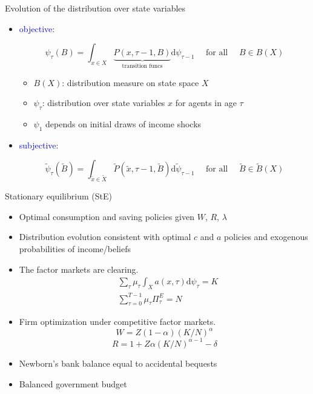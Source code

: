 \documentclass{beamer}
\begin{document}
\begin{frame}{Evolution of the distribution over state variables}
		\begin{itemize}
		\item \textcolor{blue}{objective}: 
		
		\begin{equation*}
			\label{Eq:DistDyn}
			\psi_{\tau}(B)=\int_{x \in X} \underbrace{P(x, \tau-1, B)}_{\text{transition funcs}}  \mathrm{d}\psi_{\tau-1} \quad \text { for all } \quad B\in B(X)
		\end{equation*}
	
	\begin{itemize}
		\item $B(X)$:  distribution measure on state space $X$
		\item $\psi_{\tau}$: distribution over state variables $x$ for agents in age $\tau$
		\item $\psi_{1}$ depends on initial draws of income shocks 
	\end{itemize}

		\item \textcolor{blue}{subjective}: 
		
		\begin{equation*}
			\label{Eq:DistDynSub}
			\tilde \psi_{\tau}(\tilde B)=\int_{\tilde x \in \tilde X} \tilde P(\tilde x, \tau-1, \tilde B) \mathrm{d} \tilde \psi_{\tau-1} \quad \text { for all } \quad \tilde B \in \tilde B(X)
		\end{equation*}
	
	\end{itemize}
\end{frame}

\begin{frame}{Stationary equilibrium (StE)}
\begin{itemize}
	\item Optimal consumption and saving policies given $W$, $R$, $\lambda$
	\item Distribution evolution consistent with optimal $c$ and $a$ policies and exogenous probabilities of income/beliefs
	\item The factor markets are clearing. 
	\begin{equation*}
	\begin{split}
		& \sum_{\tau} \mu_{\tau} \int_{X}a(x, \tau) \mathrm{d} \psi_{\tau}=K \\
		& \sum^{T-1}_{\tau=0} \mu_{\tau} \Pi^E_\tau= N
	\end{split}
	\end{equation*}
\item Firm optimization under competitive factor markets.
$$W = Z(1-\alpha) (K/N)^\alpha $$
$$R = 1+Z\alpha (K/N)^{\alpha-1} - \delta$$
\item Newborn's bank balance equal to accidental bequests
\item Balanced government budget 
\end{itemize}
\end{frame}
\end{document}
